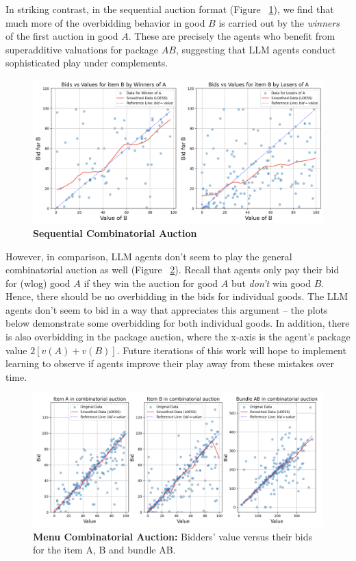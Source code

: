 \documentclass{article} %
\begin{document}
In striking contrast, in the sequential auction format (Figure ~\ref{fig:sequ}), we find that much more of the overbidding behavior in good $B$ is carried out by the \textit{ winners} of the first auction in good $A$. These are precisely the agents who benefit from superadditive valuations for package $AB$, suggesting that LLM agents conduct sophisticated play under complements. 
\begin{figure}[h!]
    \centering \includegraphics[width=0.9\linewidth]{Figs/Sequ.png}
    \caption{\textbf{Sequential Combinatorial Auction} }
    \label{fig:sequ}
\end{figure}

However, in comparison, LLM agents don't seem to play the general combinatorial auction as well (Figure ~\ref{fig:menu}). Recall that agents only pay their bid for (wlog) good $A$ if they win the auction for good $A$ but \textit{don't} win good $B$. Hence, there should be no overbidding in the bids for individual goods. The LLM agents don't seem to bid in a way that appreciates this argument -- the plots below demonstrate some overbidding for both individual goods. In addition, there is also overbidding in the package auction, where the x-axis is the agent's package value $2[v(A) + v(B)]$. Future iterations of this work will hope to implement learning to observe if agents improve their play away from these mistakes over time.

\begin{figure}[h]
    \centering \includegraphics[width=\linewidth]{Figs/menu.png}
    \caption{\textbf{Menu Combinatorial Auction:} Bidders' value versus their bids for the item A, B and bundle AB. }
    \label{fig:menu}
\end{figure}
\end{document}
